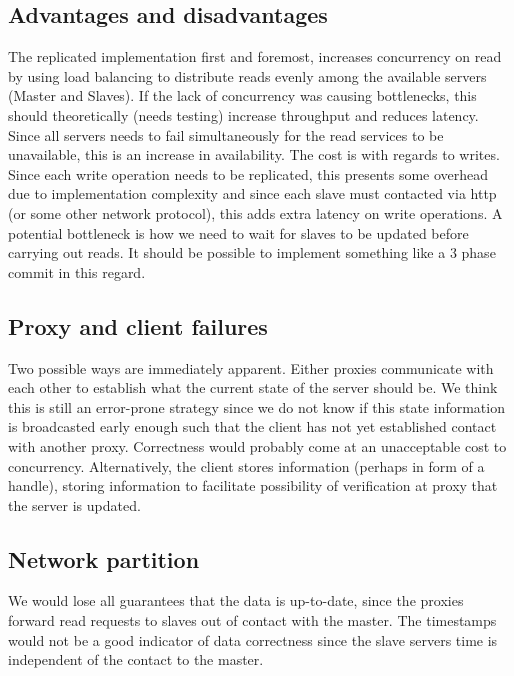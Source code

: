 \subsection{Advantages and disadvantages}
The replicated implementation first and foremost, increases concurrency on
read by using load balancing to distribute reads evenly among the available
servers (Master and Slaves). If the lack of concurrency was causing
bottlenecks, this should theoretically (needs testing) increase throughput and
reduces latency. Since all servers needs to fail simultaneously for the read
services to be unavailable, this is an increase in availability. The cost is
with regards to writes. Since each write operation needs to be replicated,
this presents some overhead due to implementation complexity and since each
slave must contacted via http (or some other network protocol), this adds
extra latency on write operations. A potential bottleneck is how we need to
wait for slaves to be updated before carrying out reads. It should be possible
to implement something like a 3 phase commit in this regard.

\subsection{Proxy and client failures}
Two possible ways are immediately apparent. Either proxies communicate with
each other to establish what the current state of the server should be. We
think this is still an error-prone strategy since we do not know if this state
information is broadcasted early enough such that the client has not yet
established contact with another proxy. Correctness would probably come at an
unacceptable cost to concurrency. Alternatively, the client stores information
(perhaps in form of a handle), storing information to facilitate possibility
of verification at proxy that the server is updated.

\subsection{Network partition}
We would lose all guarantees that the data is up-to-date, since the proxies
forward read requests to slaves out of contact with the master. The timestamps
would not be a good indicator of data correctness since the slave servers time
is independent of the contact to the master.

